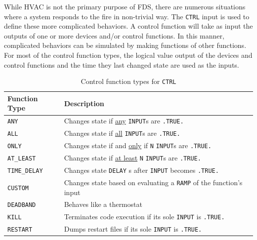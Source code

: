 \documentclass[11pt]{book}
\newcommand{\ct}{\tt\small}
\begin{document}
While HVAC is not the primary purpose of FDS, there are numerous situations where a system responds to
the fire in non-trivial way.  The {\ct CTRL} input is used to define these more complicated behaviors.
A control function will take as input the outputs of one or more devices and/or control functions.
In this manner, complicated behaviors can be simulated by making functions of other functions.  For most of the
control function types, the logical value output of the devices and control functions and the time they last changed
state are used as the inputs.


\begin{table}[h!]
\caption{Control function types for {\ct CTRL}}
\label{tab:funcvalues} 
\begin{center}
\begin{tabular}{|l||l|}
\hline
Function Type                     & Description   \\ \hline \hline
{\ct ANY}                         & Changes state if \underline{any} {\ct INPUT}s are {\ct .TRUE.}     \\ \hline
{\ct ALL}                         & Changes state if \underline{all} {\ct INPUT}s are {\ct .TRUE.}  \\ \hline
{\ct ONLY}                        & Changes state if and \underline{only} if {\ct N} {\ct INPUT}s are {\ct .TRUE.}     \\ \hline
{\ct AT\_LEAST}                   & Changes state if \underline{at least} {\ct N} {\ct INPUT}s are {\ct .TRUE.}     \\ \hline \hline
{\ct TIME\_DELAY}                 & Changes state {\ct DELAY} s after {\ct INPUT} becomes {\ct .TRUE.}      \\ \hline
{\ct CUSTOM}                      & Changes state based on evaluating a {\ct RAMP} of the function's input     \\ \hline
{\ct DEADBAND}                    & Behaves like a thermostat     \\ \hline
{\ct KILL}                        & Terminates code execution if its sole {\ct INPUT} is {\ct .TRUE.}  \\ \hline
{\ct RESTART}                     & Dumps restart files if its sole {\ct INPUT} is {\ct .TRUE.} \\ \hline
\end{tabular}
\end{center}
\end{table}
\end{document}

